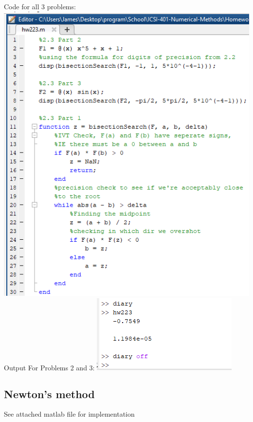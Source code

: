 \documentclass{article}
\begin{document}
Code for all 3 problems:
\newline
\includegraphics[scale=0.5]{Homework2/2.3code.png}
\newline
Output For Problems 2 and 3:
\newline
\includegraphics{Homework2/2.3diary.png}
\newline


\subsection{Newton’s method}
See attached matlab file for implementation 
\end{document}
